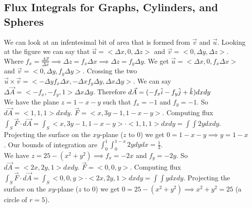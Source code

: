 \documentclass{article}
\begin{document}
\subsection{Flux Integrals for Graphs, Cylinders, and Spheres}
{}
We can look at an infentesimal bit of area that is formed from $\vec{v}$ and $\vec{u}$.
Looking at the figure we can say that $\vec{u} = <\Delta x, 0, \Delta z>$ and $\vec{v} = <0, \Delta y, \Delta z>$.
Where $f_x = \frac{\Delta Z}{\Delta x} \implies \Delta z = f_x \Delta x \implies \Delta z = f_y \Delta y$.
We get $\vec{u} = <\Delta x, 0, f_x \Delta x>$ and $\vec{v} = <0, \Delta y, f_y \Delta y>$.
Crossing the two $\vec{u} \times \vec{v} = <-\Delta y f_x \Delta x, -\Delta x f_y \Delta y, \Delta x \Delta y>$.
We can say $\Delta \vec{A} = <-f_x,-f_y,1> \Delta x \Delta y$. Therefore $d\vec{A} = (-f_x \hat{i} - f_y \hat{j} + \hat{k}) dx dy$
\sol \\
We have the plane $z = 1-x-y$ such that $f_x = -1$ and $f_y = -1$. So $d\vec{A} = <1,1,1> dx dy$.
$\vec{F} = <x,3y-1,1-x-y>$. Computing flux $\int_S \vec{F} \cdot d\vec{A} = \int_S <x,3y-1,1-x-y>\cdot<1,1,1> dx dy = \int \int 2y dx dy$.
Projecting the surface on the $xy$-plane ($z$ to 0) we get $0=1-x-y \implies y=1-x$.
Our bounds of integration are $\int_0^1 \int_0^{1-x} 2y dy dx = \frac{1}{3}$.
\sol \\
We have $z = 25 - (x^2+y^2) \implies f_x = -2x$ and $f_y = -2y$. So $d\vec{A} = <2x,2y,1> dx dy$.
$\vec{F} = <0,0,y>$. Computing flux $\int_S \vec{F} \cdot d\vec{A} = \int_S <0,0,y>\cdot<2x,2y,1> dx dy = \int \int y dx dy$.
Projecting the surface on the $xy$-plane ($z$ to 0) we get $0=25-(x^2+y^2) \implies x^2+y^2=25$ (a circle of $r = 5$).
\end{document}
